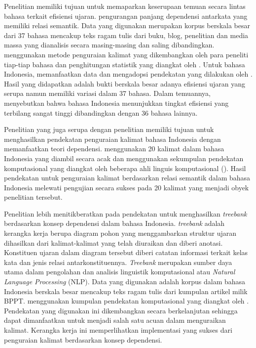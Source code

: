 Penelitian \cite{futrell2015large} memiliki tujuan untuk memaparkan keserupaan temuan secara lintas bahasa terkait efisiensi ujaran. pengurangan panjang dependensi antarkata yang memiliki relasi semantik. Data yang digunakan merupakan korpus berskala besar dari 37 bahasa mencakup teks ragam tulis dari buku, blog, penelitian dan media massa yang dianalisis secara masing-masing dan saling dibandingkan. \cite{futrell2015large} menggunakan metode penguraian kalimat yang dikembangkan oleh para peneliti tiap-tiap bahasa dan penghitungan statistik yang diangkat oleh \cite{gelman2007data}. Untuk bahasa Indonesia, \cite{futrell2015large} memanfaatkan data dan mengadopsi pendekatan yang dilakukan oleh \cite{green2012indonesian}. Hasil yang didapatkan adalah bukti berskala besar adanya efisiensi ujaran yang serupa namun memiliki variasi dalam 37 bahasa. Dalam temuannya, \cite{futrell2015large} menyebutkan bahwa bahasa Indonesia menunjukkan tingkat efisiensi yang terbilang sangat tinggi dibandingkan dengan 36 bahasa lainnya. 

Penelitian \cite{green2012indonesian} yang juga serupa dengan penelitian \cite{kamayani2011dependency} memiliki tujuan untuk menghasilkan pendekatan penguraian kalimat bahasa Indonesia dengan memanfaatkan teori dependensi. \cite{kamayani2011dependency} menggunakan 20 kalimat dalam bahasa Indonesia yang diambil secara acak dan menggunakan sekumpulan pendekatan komputasional yang diangkat oleh beberapa ahli linguis komputasional (\citealp{nivre2006dependency, covington2001fundamental, de2008stanford}). Hasil pendekatan untuk penguraian kalimat berdasarkan relasi semantik dalam bahasa Indonesia melewati pengujian secara sukses pada 20 kalimat yang menjadi obyek penelitian tersebut.

Penelitian \cite{green2012indonesian} lebih menitikberatkan pada pendekatan untuk menghasilkan \textit{treebank} berdasarkan konsep dependensi dalam bahasa Indonesia. \textit{treebank} adalah kerangka kerja berupa diagram pohon yang menggambarkan struktur ujaran dihasilkan dari kalimat-kalimat yang telah diuraikan dan diberi anotasi. Konstituen ujaran dalam diagram tersebut diberi catatan informasi terkait kelas kata dan jenis relasi antarkonstituennya. \textit{Treebank} merupakan sumber daya utama dalam pengolahan dan analisis linguistik komputasional atau \textit{Natural Language Processing} (NLP). Data yang digunakan adalah korpus dalam bahasa Indonesia berskala besar mencakup teks ragam tulis dari kumpulan artikel milik BPPT. \cite{green2012indonesian} menggunakan kumpulan pendekatan komputasional yang diangkat oleh \cite{kubler2009dependency}. Pendekatan yang digunakan \cite{green2012indonesian} ini dikembangkan secara berkelanjutan sehingga dapat dimanfaatkan untuk menjadi salah satu acuan dalam menguraikan kalimat. Kerangka kerja ini memperlihatkan implementasi yang sukses dari penguraian kalimat berdasarkan konsep dependensi.

